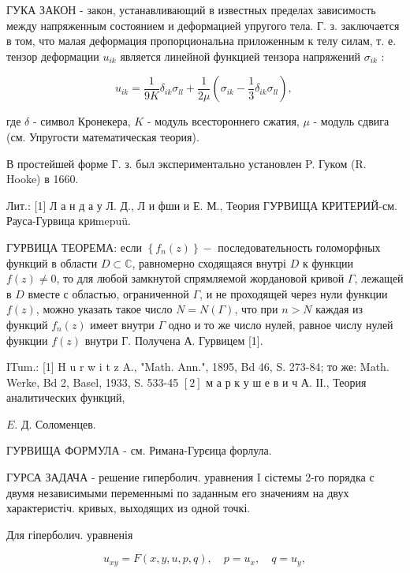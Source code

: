 \documentclass[10pt]{article}
\begin{document}
ГУКА ЗАКОН - закон, устанавливающий в известных пределах зависимость между напряженным состоянием и деформацией упругого тела. Г. з. заключается в том, что малая деформация пропорциональна приложенным к телу силам, т. е. тензор деформации $u_{i k}$ является линейной функцией тензора напряжений $\sigma_{i k}$ :



\[

u_{i k}=\frac{1}{9 K} \delta_{i k} \sigma_{l l}+\frac{1}{2 \mu}\left(\sigma_{i k}-\frac{1}{3} \delta_{i k} \sigma_{l l}\right) \text {, }

\]



где $\delta$ - символ Кронекера, $K$ - модуль всестороннего сжатия, $\mu$ - модуль сдвига (см. Упругости математическая теория).



В простейшей форме Г. з. был экспериментально установлен P. Гуком (R. Hooke) в 1660.



Лит.: [1] Л а н д а у Л. Д., Л и фши и Е. М., Теория ГУРВИЩА КРИТЕРИЙ-см. Рауса-Гурвица криmepuü.



ГУРВИЦА ТЕОРЕМА: если $\left\{f_{n}(z)\right\}-$ последовательность голоморфных функций в области $D \subset \mathbb{C}$, равномерно сходящаяся внутрі $D$ к функции $f(z) \neq 0$, то для любой замкнутой спрямляемой жордановой кривой $\Gamma$, лежащей в $D$ вместе с областью, ограниченной $\Gamma$, и не проходящей через нули функции $f(z)$, можно указать такое число $N=N(\Gamma)$, что при $n>N$ каждая из функций $f_{n}(z)$ имеет внутри $\Gamma$ одно и то же число нулей, равное числу нулей функции $f(z)$ внутри $Г$. Получена А. Гурвицем [1].



ITum.: [1] H u r w i t z A., "Math. Ann.", 1895, Bd 46, S. 273-84; то же: Math. Werke, Bd 2, Basel, 1933, S. 533-45 $[2]$ м а р к у ш е в и ч А. ІІ., Теория аналитических функций,

$E$. Д. Соломенцев.



ГУРВИЩА ФОРМУЛА - см. Римана-Гурєица форлула.



ГУРСА ЗАДАЧА - решение гиперболич. уравнения I сістемы 2-го порядка с двумя независимыми переменнымі по заданным его значениям на двух характеристіч. кривых, выходящих из одной точкі.



Для гіперболич. уравненія



\[

u_{x y}=F(x, y, u, p, q), \quad p=u_{x}, \quad q=u_{y},

\]
\end{document}
